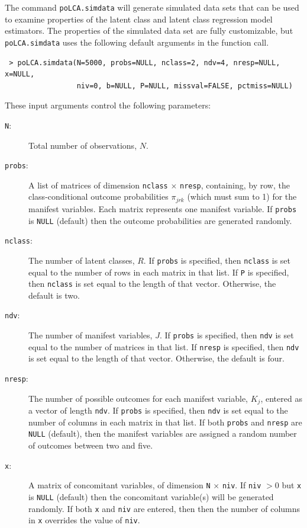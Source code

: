 \documentclass[letterpaper,12pt]{article}
\begin{document}
The command \texttt{poLCA.simdata} will generate simulated data sets that can be used to examine properties of the latent class and latent class regression model estimators.  The properties of the simulated data set are fully customizable, but \texttt{poLCA.simdata} uses the following default arguments in the function call.
\begin{verbatim}
 > poLCA.simdata(N=5000, probs=NULL, nclass=2, ndv=4, nresp=NULL, x=NULL,
                 niv=0, b=NULL, P=NULL, missval=FALSE, pctmiss=NULL)
\end{verbatim}
These input arguments control the following parameters:
\begin{description}
    \item [\texttt{N}:] Total number of observations, $N$.
    \item [\texttt{probs}:] A list of matrices of dimension \texttt{nclass} $\times$ \texttt{nresp}, containing, by row, the class-conditional outcome probabilities $\pi_{jrk}$ (which must sum to 1) for the manifest variables. Each matrix represents one manifest variable. If \texttt{probs} is \texttt{NULL} (default) then the outcome probabilities are generated randomly.
    \item [\texttt{nclass}:] The number of latent classes, $R$. If \texttt{probs} is specified, then \texttt{nclass} is set equal to the number of rows in each matrix in that list. If \texttt{P} is specified, then \texttt{nclass} is set equal to the length of that vector. Otherwise, the default is two.
    \item [\texttt{ndv}:] The number of manifest variables, $J$.  If \texttt{probs} is specified, then \texttt{ndv} is set equal to the number of matrices in that list. If \texttt{nresp} is specified, then \texttt{ndv} is set equal to the length of that vector. Otherwise, the default is four.
    \item [\texttt{nresp}:] The number of possible outcomes for each manifest variable, $K_j$, entered as a vector of length \texttt{ndv}. If \texttt{probs} is specified, then \texttt{ndv} is set equal to the number of columns in each matrix in that list. If both \texttt{probs} and \texttt{nresp} are \texttt{NULL} (default), then the manifest variables are assigned a random number of outcomes between two and five.
    \item [\texttt{x}:] A matrix of concomitant variables, of dimension \texttt{N} $\times$ \texttt{niv}. If \texttt{niv} $>0$ but \texttt{x} is \texttt{NULL} (default) then the concomitant variable(s) will be generated randomly. If both \texttt{x} and \texttt{niv} are entered, then then the number of columns in \texttt{x} overrides the value of \texttt{niv}.

\end{description}
\end{document}
